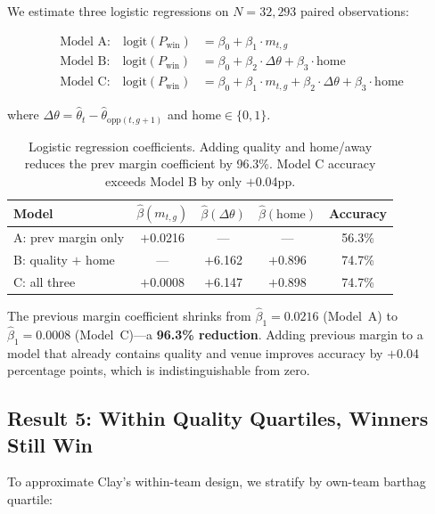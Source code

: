 \documentclass[11pt]{article}
\begin{document}
We estimate three logistic regressions on $N = 32{,}293$ paired observations:

\begin{align}
\text{Model A:} \quad \text{logit}(P_{\text{win}}) &= \beta_0 + \beta_1 \cdot m_{t,g} \label{eq:model_a} \\
\text{Model B:} \quad \text{logit}(P_{\text{win}}) &= \beta_0 + \beta_2 \cdot \Delta\theta + \beta_3 \cdot \text{home} \label{eq:model_b} \\
\text{Model C:} \quad \text{logit}(P_{\text{win}}) &= \beta_0 + \beta_1 \cdot m_{t,g} + \beta_2 \cdot \Delta\theta + \beta_3 \cdot \text{home} \label{eq:model_c}
\end{align}

\noindent where $\Delta\theta = \hat{\theta}_t - \hat{\theta}_{\text{opp}(t,g+1)}$ and $\text{home} \in \{0,1\}$.

\begin{table}[h]
\centering
\begin{tabular}{lcccc}
\toprule
Model & $\hat{\beta}(m_{t,g})$ & $\hat{\beta}(\Delta\theta)$ & $\hat{\beta}(\text{home})$ & Accuracy \\
\midrule
A: prev margin only & $+$0.0216 & --- & --- & 56.3\% \\
B: quality $+$ home & --- & $+$6.162 & $+$0.896 & 74.7\% \\
C: all three & $+$0.0008 & $+$6.147 & $+$0.898 & 74.7\% \\
\bottomrule
\end{tabular}
\caption{Logistic regression coefficients. Adding quality and home/away reduces the prev margin coefficient by 96.3\%. Model C accuracy exceeds Model B by only $+$0.04pp.}
\label{tab:logistic}
\end{table}

\noindent The previous margin coefficient shrinks from $\hat{\beta}_1 = 0.0216$ (Model~A) to $\hat{\beta}_1 = 0.0008$ (Model~C)---a \textbf{96.3\% reduction}. Adding previous margin to a model that already contains quality and venue improves accuracy by $+$0.04 percentage points, which is indistinguishable from zero.

\subsection{Result 5: Within Quality Quartiles, Winners Still Win}

To approximate Clay's within-team design, we stratify by own-team barthag quartile:
\end{document}
